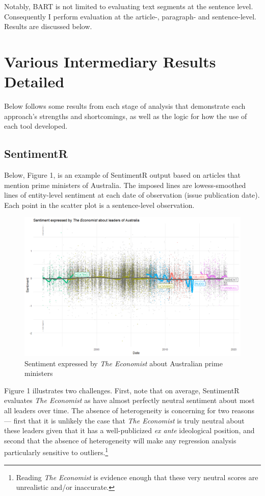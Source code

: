 \documentclass[11pt, letterpaper, twoside]{article}
\begin{document}
    Notably, BART is not limited to evaluating text segments at the sentence level. Consequently I perform evaluation at the article-, paragraph-  and sentence-level. Results are discussed below.

\section{Various Intermediary Results Detailed}
    Below follows some results from each stage of analysis that demonstrate each approach's strengths and shortcomings, as well as the logic for how the use of each tool developed. 
    \subsection{SentimentR}
        Below, Figure 1, is an example of SentimentR output based on articles that mention prime ministers of Australia. The imposed lines are lowess-smoothed lines of entity-level sentiment at each date of observation (issue publication date). Each point in the scatter plot is a sentence-level observation.

        \begin{figure}[t]
            \caption{Sentiment expressed by \textit{The Economist} about Australian prime ministers}
            \includegraphics[width=\textwidth]{figures/900_timeline_fig.png}     
        \end{figure}

        Figure 1 illustrates two challenges. First, note that on average, SentimentR evaluates \textit{The Economist} as have almost perfectly neutral sentiment about most all leaders over time. The absence of heterogeneity is concerning for two reasons --- first that it is unlikely the case that \textit{The Economist} is truly neutral about these leaders given that it has a well-publicized \textit{ex ante} ideological position, and second that the absence of heterogeneity will make any regression analysis particularly sensitive to outliers.\footnote{Reading \textit{The Economist} is evidence enough that these very neutral scores are unrealistic and/or inaccurate.}
\end{document}

